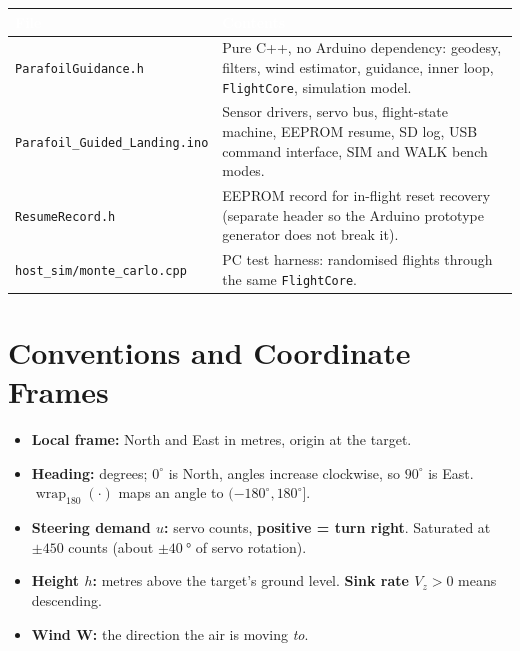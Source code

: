 \documentclass[11pt,a4paper]{article}
\newcommand{\hdr}[1]{\textcolor{white}{\textbf{#1}}}
\newcommand{\code}[1]{\texttt{#1}}
\newcommand{\vect}[1]{\mathbf{#1}}
\newcommand{\wrap}{\operatorname{wrap}}
\begin{document}
\begin{center}
\small
\renewcommand{\arraystretch}{1.2}
\begin{tabularx}{\linewidth}{p{5.6cm}Y}
\toprule
{}\hdr{File} & \hdr{Contents} \\
\midrule
\code{ParafoilGuidance.h} & Pure C++, no Arduino dependency: geodesy, filters, wind estimator, guidance, inner loop, \code{FlightCore}, simulation model. \\
\code{Parafoil\_Guided\_Landing.ino} & Sensor drivers, servo bus, flight-state machine, EEPROM resume, SD log, USB command interface, SIM and WALK bench modes. \\
\code{ResumeRecord.h} & EEPROM record for in-flight reset recovery (separate header so the Arduino prototype generator does not break it). \\
\code{host\_sim/monte\_carlo.cpp} & PC test harness: randomised flights through the same \code{FlightCore}. \\
\bottomrule
\end{tabularx}
\end{center}

\section{Conventions and Coordinate Frames}

\begin{itemize}
  \item \textbf{Local frame:} North and East in metres, origin at the target.
  \item \textbf{Heading:} degrees; $0^\circ$ is North, angles increase
        clockwise, so $90^\circ$ is East. $\wrap_{180}(\cdot)$ maps an angle to
        $(-180^\circ, 180^\circ]$.
  \item \textbf{Steering demand $u$:} servo counts, \textbf{positive = turn
        right}. Saturated at $\pm 450$ counts (about $\pm\SI{40}{\degree}$ of
        servo rotation).
  \item \textbf{Height $h$:} metres above the target's ground level.
        \textbf{Sink rate $V_z > 0$} means descending.
  \item \textbf{Wind $\vect W$:} the direction the air is moving \emph{to}.
\end{itemize}
\end{document}
